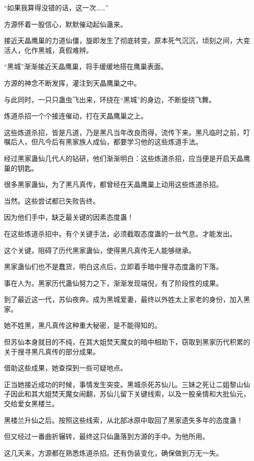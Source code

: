 \begin{this_body}
“如果我算得没错的话，这一次……”

方源怀着一股信心，默默催动起仙蛊来。

接近天晶鹰巢的力道仙僵，旋即发生了彻底转变。原本死气沉沉，顷刻之间，大变活人，化作黑城，真假难辨。

“黑城”渐渐接近天晶鹰巢，将手缓缓地搭在鹰巢表面。

方源的神念不断发挥，灌注到天晶鹰巢之中。

与此同时，一只只蛊虫飞出来，环绕在“黑城”的身边，不断旋绕飞舞。

炼道杀招一个个接连催动，打在天晶鹰巢之上。

这些炼道杀招，皆是凡道，乃是黑凡当年改良而得，流传下来。黑凡临时之前，叮嘱后人，但凡今后有黑家族人成仙，都要学习他的这些炼道手法。

经过黑家蛊仙几代人的钻研，他们渐渐明白：这些炼道杀招，应当便是开启天晶鹰巢的钥匙。

很多黑家蛊仙，为了黑凡真传，都曾经在天晶鹰巢上动用这些炼道杀招。

当然。这些尝试都已失败告终。

因为他们手中，缺乏最关键的因素态度蛊！

在这些炼道杀招中。有个关键手法，必须截取态度蛊的一丝气息。才能发出。

这个关键，阻碍了历代黑家蛊仙，使得黑凡真传无人能够继承。

黑家蛊仙们也不是蠢货，明白这点后，立即着手暗中搜寻态度蛊的下落。

事在人为，黑家历代蛊仙努力之下，渐渐发现端倪，有了阶段性的成果。

到了最近这一代，苏仙夜奔。成为黑城爱妻，最终以外姓太上家老的身份，加入黑家。

她不姓黑，黑凡真传这种重大秘密，是不能得知的。

但苏仙本身就目的不纯，在其大姐焚天魔女的暗中相助下，窃取到黑家历代积累的关于搜寻黑凡真传的部分成果。

借助这些成果，她查探到一些可疑地点。

正当她接近成功的时候，事情发生突变。黑城杀死苏仙儿。三妹之死让二姐黎山仙子因此和其大姐焚天魔女闹翻，苏仙儿留下关键线索，以及一股亲情和大批仙元，交给爱女黑楼兰。

黑楼兰升仙之后。按照这些线索，从北部冰原中取回了黑家遗失多年的态度蛊！

但又经过一番曲折辗转，最终这只仙蛊落到方源的手中。为他所用。

这几天来，方源都在熟悉炼道杀招。还有伪装变化，确保做到万无一失。


\end{this_body}
